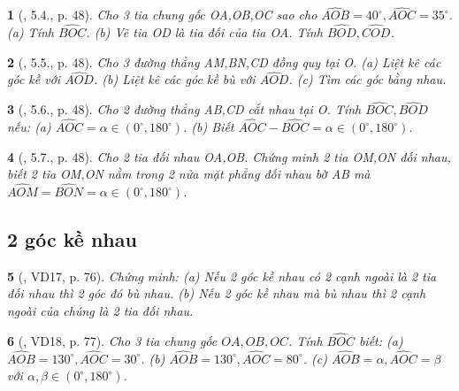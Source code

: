 \documentclass{article}
\newtheorem{baitoan}{}
\begin{document}
\begin{baitoan}[\cite{TLCT_THCS_Toan_6_hinh_hoc}, 5.4., p. 48]
	Cho 3 tia chung gốc OA,OB,OC sao cho $\widehat{AOB} = 40^\circ,\widehat{AOC} = 35^\circ$. (a) Tính $\widehat{BOC}$. (b) Vẽ tia OD là tia đối của tia OA. Tính $\widehat{BOD},\widehat{COD}$.
\end{baitoan}

\begin{baitoan}[\cite{TLCT_THCS_Toan_6_hinh_hoc}, 5.5., p. 48]
	Cho 3 đường thẳng AM,BN,CD đồng quy tại O. (a) Liệt kê các góc kề với $\widehat{AOD}$. (b) Liệt kê các góc kề bù với $\widehat{AOD}$. (c) Tìm các góc bằng nhau.
\end{baitoan}

\begin{baitoan}[\cite{TLCT_THCS_Toan_6_hinh_hoc}, 5.6., p. 48]
	Cho 2 đường thẳng AB,CD cắt nhau tại O. Tính $\widehat{BOC},\widehat{BOD}$ nếu: (a) $\widehat{AOC} = \alpha\in(0^\circ,180^\circ)$. (b) Biết $\widehat{AOC} - \widehat{BOC} = \alpha\in(0^\circ,180^\circ)$.
\end{baitoan}

\begin{baitoan}[\cite{TLCT_THCS_Toan_6_hinh_hoc}, 5.7., p. 48]
	Cho 2 tia đối nhau OA,OB. Chứng minh 2 tia OM,ON đối nhau, biết 2 tia OM,ON nằm trong 2 nửa mặt phẳng đối nhau bờ AB mà $\widehat{AOM} = \widehat{BON} = \alpha\in(0^\circ,180^\circ)$.
\end{baitoan}


\subsection{2 góc kề nhau}

\begin{baitoan}[\cite{Binh_Toan_6_tap_2}, VD17, p. 76]
	Chứng minh: (a) Nếu 2 góc kề nhau có 2 cạnh ngoài là 2 tia đối nhau thì 2 góc đó bù nhau. (b) Nếu 2 góc kề nhau mà bù nhau thì 2 cạnh ngoài của chúng là 2 tia đối nhau.
\end{baitoan}

\begin{baitoan}[\cite{Binh_Toan_6_tap_2}, VD18, p. 77]
	Cho 3 tia chung gốc $OA,OB,OC$. Tính $\widehat{BOC}$ biết: (a) $\widehat{AOB} = 130^\circ,\widehat{AOC} = 30^\circ$. (b) $\widehat{AOB} = 130^\circ,\widehat{AOC} = 80^\circ$. (c) $\widehat{AOB} = \alpha,\widehat{AOC} = \beta$ với $\alpha,\beta\in(0^\circ,180^\circ)$.
\end{baitoan}
\end{document}
